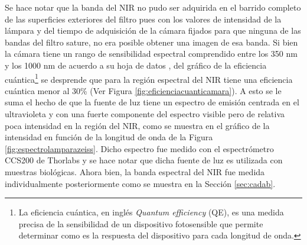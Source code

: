 Se hace notar que la banda del NIR no pudo ser adquirida en el barrido completo de las superficies exteriores del filtro pues con los valores de intensidad de la lámpara y del tiempo de adquisición de la cámara fijados para que ninguna de las bandas del filtro sature, no era posible obtener una imagen de esa banda. Si bien la cámara tiene un rango de sensibilidad espectral comprendido entre los 350 nm y los 1000 nm de acuerdo a su hoja de datos \cite{axiozeiss}, del gráfico de la eficiencia cuántica\footnote{La eficiencia cuántica, en inglés \textit{Quantum efficiency} (QE), es una medida precisa de la sensibilidad de un dispositivo fotosensible que permite determinar como es la respuesta del dispositivo para cada longitud de onda.} se desprende que para la región espectral del NIR tiene una eficiencia cuántica menor al 30\% (Ver Figura \ref{fig:eficienciacuanticamara}). A esto se le suma el hecho de que la fuente de luz tiene un espectro de emisión centrada en el ultravioleta y con una fuerte componente del espectro visible pero de relativa poca intensidad en la región del NIR, como se muestra en el gráfico de la intensidad en función de la longitud de onda de la Figura \ref{fig:espectrolamparazeiss}. Dicho espectro fue medido con el espectrómetro CCS200 de Thorlabs y se hace notar que dicha fuente de luz es utilizada con muestras biológicas. Ahora bien, la banda espectral del NIR fue medida individualmente posteriormente como se muestra en la Sección \ref{sec:cadab}.

